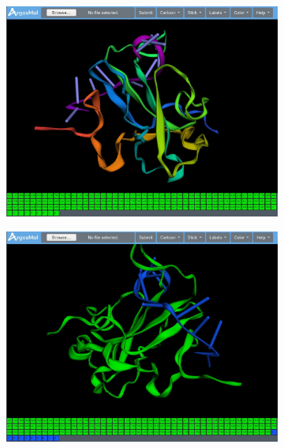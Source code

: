 \documentclass{article}
\begin{document}
\begin{figure}[H]
	\begin{subfigure}{.5\textwidth}
		\centering
		\includegraphics[width=.99\linewidth]{img/argosmol/mol6}
		\caption{}
		\label{fig:sfig1}
	\end{subfigure}%
	\begin{subfigure}{.5\textwidth}
		\centering
		\includegraphics[width=.99\linewidth]{img/argosmol/mol7}
		\caption{}
		\label{fig:sfig2}
	\end{subfigure}
	\begin{subfigure}{.5\textwidth}
		\centering

\end{subfigure}
\end{figure}
\end{document}
